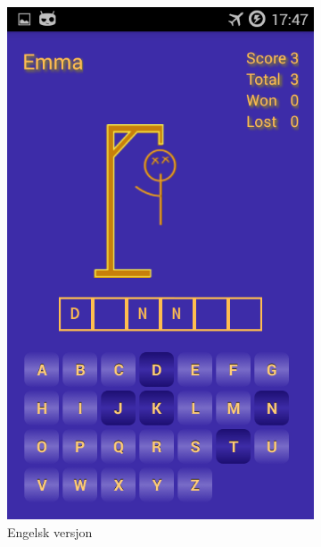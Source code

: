 \begin{figure}[ht]
    \centering
   \begin{subfigure}[b]{0.3\textwidth}
        \includegraphics[width=\textwidth]{./img/losninger/1.png}
        \caption{Engelsk versjon}
        \label{fig:aktivitet_engelsk}
    \end{subfigure}
    \begin{subfigure}[b]{0.3\textwidth}

\end{subfigure}
\end{figure}
